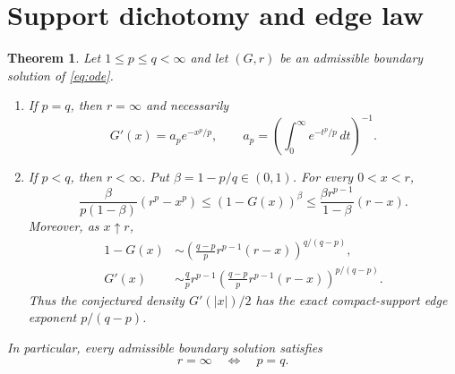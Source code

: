 \documentclass[10pt]{article}
\newtheorem{theorem}{Theorem}
\begin{document}
\section*{Support dichotomy and edge law}

\begin{theorem}\label{thm:main}
Let $1\le p\le q<\infty$ and let $(G,r)$ be an admissible boundary solution
of \eqref{eq:ode}.
\begin{enumerate}
\item If $p=q$, then $r=\infty$ and necessarily
\begin{equation}\label{eq:diagonal}
 G'(x)=a_p e^{-x^p/p},\qquad
 a_p=\left(\int_0^\infty e^{-t^p/p}\,dt\right)^{-1}.
\end{equation}
\item If $p<q$, then $r<\infty$.  Put
$\beta=1-p/q\in(0,1)$.  For every $0<x<r$,
\begin{equation}\label{eq:bounds}
 \frac{\beta}{p(1-\beta)}(r^p-x^p)
 \le (1-G(x))^\beta
 \le \frac{\beta r^{p-1}}{1-\beta}(r-x).
\end{equation}
Moreover, as $x\uparrow r$,
\begin{align}
 1-G(x)
 &\sim
 \left(\frac{q-p}{p}r^{p-1}(r-x)\right)^{q/(q-p)},
 \label{eq:edgeG}\\
 G'(x)
 &\sim \frac qp r^{p-1}
 \left(\frac{q-p}{p}r^{p-1}(r-x)\right)^{p/(q-p)}.
 \label{eq:edgeg}
\end{align}
Thus the conjectured density $G'(|x|)/2$ has the exact compact-support edge
exponent $p/(q-p)$.
\end{enumerate}
In particular, every admissible boundary solution satisfies
\[
                         r=\infty\quad\Longleftrightarrow\quad p=q.
\]
\end{theorem}
\end{document}
